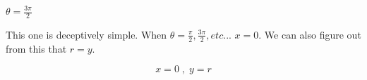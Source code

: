 \begin{problem}[83.]
    $\theta = \frac{3\pi}{2}$
\end{problem}

\begin{solution}
    This one is deceptively simple. When $\theta = \frac{\pi}{2}, \frac{3\pi}{2}, etc...$ $x=0$. We can also figure out from this that $r=y$.
    
    \[\boxed{x = 0 \; , \; y = r}\]
\end{solution}
